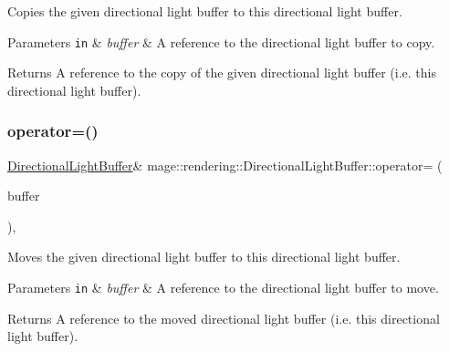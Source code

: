 Copies the given directional light buffer to this directional light buffer.


\begin{DoxyParams}[1]{Parameters}
\mbox{\tt in}  & {\em buffer} & A reference to the directional light buffer to copy. \\
\hline
\end{DoxyParams}
\begin{DoxyReturn}{Returns}
A reference to the copy of the given directional light buffer (i.\+e. this directional light buffer). 
\end{DoxyReturn}
\mbox{\label{structmage_1_1rendering_1_1_directional_light_buffer_adb98ba5e4772ab90af749e521a6a6593}} 
\subsubsection{\texorpdfstring{operator=()}{operator=()}\hspace{0.1cm}{\footnotesize\ttfamily [2/2]}}
{\footnotesize\ttfamily \mbox{\hyperlink{structmage_1_1rendering_1_1_directional_light_buffer}{Directional\+Light\+Buffer}}\& mage\+::rendering\+::\+Directional\+Light\+Buffer\+::operator= (\begin{DoxyParamCaption}\item[{\mbox{\hyperlink{structmage_1_1rendering_1_1_directional_light_buffer}{Directional\+Light\+Buffer}} \&\&}]{buffer }\end{DoxyParamCaption})\hspace{0.3cm}{\ttfamily [default]}, {\ttfamily [noexcept]}}

Moves the given directional light buffer to this directional light buffer.


\begin{DoxyParams}[1]{Parameters}
\mbox{\tt in}  & {\em buffer} & A reference to the directional light buffer to move. \\
\hline
\end{DoxyParams}
\begin{DoxyReturn}{Returns}
A reference to the moved directional light buffer (i.\+e. this directional light buffer). 
\end{DoxyReturn}


